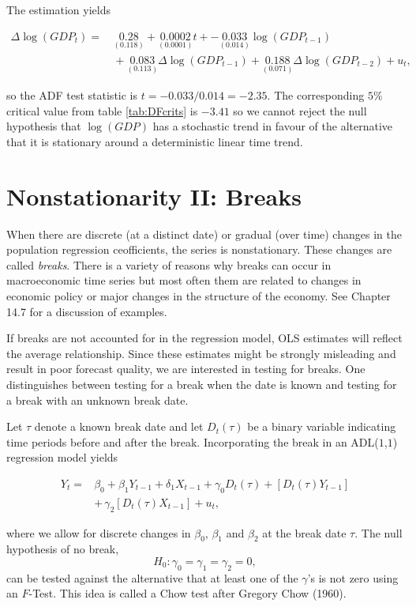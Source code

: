 \documentclass[]{book}
\theoremstyle{definition}
\theoremstyle{definition}
\theoremstyle{definition}
\theoremstyle{remark}
\begin{document}
The estimation yields

\begin{align*}
  \Delta\log(GDP_t) =& \, \underset{(0.118)}{0.28} + \underset{(0.0001)}{0.0002} t + -\underset{(0.014)}{0.033} \log(GDP_{t-1}) \\
  & \, + \underset{(0.113)}{0.083} \Delta \log(GDP_{t-1}) + \underset{(0.071)}{0.188} \Delta \log(GDP_{t-2}) + u_t,
\end{align*}

so the ADF test statistic is \(t=-0.033/0.014 = - 2.35\). The
corresponding \(5\%\) critical value from table \ref{tab:DFcrits} is
\(-3.41\) so we cannot reject the null hypothesis that \(\log(GDP)\) has
a stochastic trend in favour of the alternative that it is stationary
around a deterministic linear time trend.

\section{Nonstationarity II: Breaks}\label{nonstationarity-ii-breaks}

When there are discrete (at a distinct date) or gradual (over time)
changes in the population regression ceofficients, the series is
nonstationary. These changes are called \emph{breaks}. There is a
variety of reasons why breaks can occur in macroeconomic time series but
most often them are related to changes in economic policy or major
changes in the structure of the economy. See Chapter 14.7 for a
discussion of examples.

If breaks are not accounted for in the regression model, OLS estimates
will reflect the average relationship. Since these estimates might be
strongly misleading and result in poor forecast quality, we are
interested in testing for breaks. One distinguishes between testing for
a break when the date is known and testing for a break with an unknown
break date.

Let \(\tau\) denote a known break date and let \(D_t(\tau)\) be a binary
variable indicating time periods before and after the break.
Incorporating the break in an ADL(\(1\),\(1\)) regression model yields

\begin{align*}
  Y_t =& \beta_0 + \beta_1 Y_{t-1} + \delta_1 X_{t-1} + \gamma_0 D_t(\tau) + \left[ D_t(\tau) Y_{t-1}\right] \\ &+ \, \gamma_2\left[ D_t(\tau) X_{t-1} \right] + u_t,
\end{align*}

where we allow for discrete changes in \(\beta_0\), \(\beta_1\) and
\(\beta_2\) at the break date \(\tau\). The null hypothesis of no break,
\[H_0: \gamma_0=\gamma_1=\gamma_2=0,\] can be tested against the
alternative that at least one of the \(\gamma\)'s is not zero using an
\(F\)-Test. This idea is called a Chow test after Gregory Chow (1960).
\end{document}
